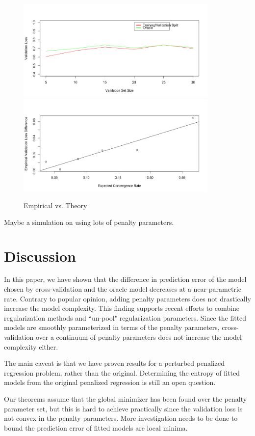 \documentclass[12pt]{article}
\begin{document}
\begin{figure}
\label{fig:emp_v_theory}
\caption{Empirical vs. Theory}
\centering
\includegraphics[height=50mm]{../R/figures/validation_size_loss.png}
\includegraphics[height=50mm]{../R/figures/qqplot.png}
\end{figure}

Maybe a simulation on using lots of penalty parameters.

\section{Discussion}

In this paper, we have shown that the difference in prediction error of the model chosen by cross-validation and the oracle model decreases at a near-parametric rate. Contrary to popular opinion, adding penalty parameters does not drastically increase the model complexity. This finding supports recent efforts to combine regularization methods and ``un-pool" regularization parameters. Since the fitted models are smoothly parameterized in terms of the penalty parameters, cross-validation over a continuum of penalty parameters does not increase the model complexity either.

The main caveat is that we have proven results for a perturbed penalized regression problem, rather than the original. Determining the entropy of fitted models from the original penalized regression is still an open question.

Our theorems assume that the global minimizer has been found over the penalty parameter set, but this is hard to achieve practically since the validation loss is not convex in the penalty parameters. More investigation needs to be done to bound the prediction error of fitted models are local minima.
\end{document}
